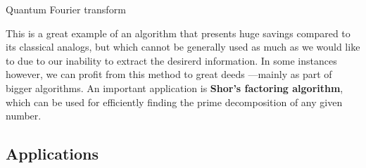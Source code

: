 \documentclass[9pt, handout, aspectratio=169]{beamer}	%
\begin{document}
\begin{frame}[allowframebreaks]{Quantum Fourier transform}
	\medskip
	\pause

	This is a great example of an algorithm that presents huge savings compared to its classical analogs, but which cannot be generally used as much as we would like to due to our inability to extract the desirerd information. In some instances however, we can profit from this method to great deeds ---mainly as part of bigger algorithms. An important application is \textbf{Shor's factoring algorithm}, which can be used for efficiently finding the prime decomposition of any given number.

\end{frame}


\subsection{Applications}
\end{document}
